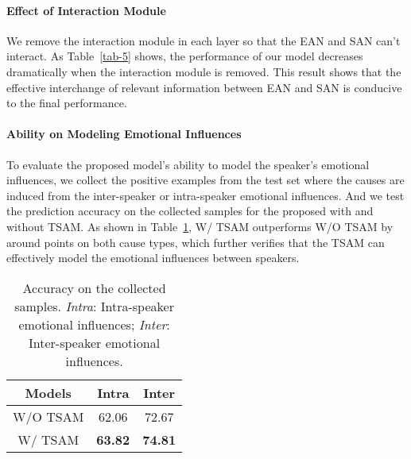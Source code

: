 \documentclass[11pt]{article}
\begin{document}
\paragraph{Effect of Interaction Module}
We remove the interaction module in each layer so that the EAN and SAN can't interact. As Table~\ref{tab-5} shows, the performance of our model decreases dramatically when the interaction module is removed. This result shows that the effective interchange of relevant information between EAN and SAN is conducive to the final performance.
\begin{table}[htbp]
\centering
{}
\caption{Results on experiments whether removing interaction module or not in TSAM.}
\label{tab-5}
\end{table}



\paragraph{Ability on Modeling Emotional Influences}
To evaluate the proposed model's ability to model the speaker's emotional influences, we collect the positive examples from the test set where the causes are induced from the inter-speaker or intra-speaker emotional influences. And we test the prediction accuracy on the collected samples for the proposed  with and without TSAM. As shown in Table~\ref{tab-6},  W/ TSAM outperforms W/O TSAM by around  points on both cause types, which further verifies that the TSAM can effectively model the emotional influences between speakers.
\begin{table}[tbp]
\centering
\renewcommand\tabcolsep{8.0pt}
\begin{tabular}{c|cc}
\hline
Models & Intra & Inter \\ \hline\hline
W/O TSAM   & 62.06 & 72.67      \\
W/ TSAM  & \textbf{63.82} & \textbf{74.81}  \\ \hline
\end{tabular}
\caption{Accuracy on the collected samples. \textit{Intra}: Intra-speaker emotional influences;  \textit{Inter}: Inter-speaker emotional influences.}
\label{tab-6}
\end{table}
\end{document}

